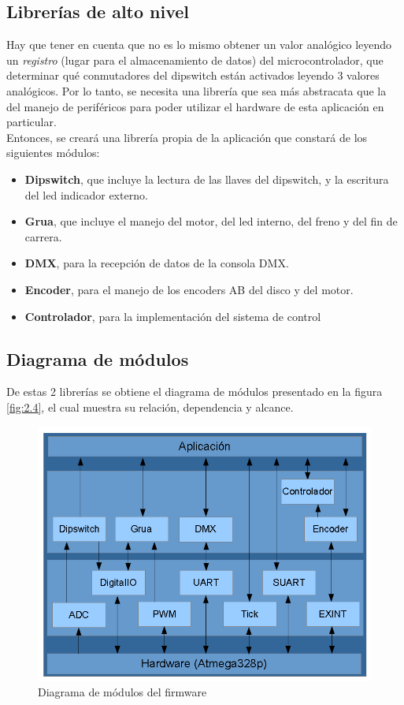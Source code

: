 \subsection{Librerías de alto nivel}
Hay que tener en cuenta que no es lo mismo obtener un valor analógico leyendo un \textit{registro} (lugar para el almacenamiento de datos) del microcontrolador, que determinar qué conmutadores del dipswitch están activados leyendo 3 valores analógicos. Por lo tanto, se necesita una librería que sea más abstracata que la del manejo de periféricos para poder utilizar el hardware de esta aplicación en particular.\\
Entonces, se creará una librería propia de la aplicación que constará de los siguientes módulos:
\begin{itemize}
	\item \textbf{Dipswitch}, que incluye la lectura de las llaves del dipswitch, y la escritura del led indicador externo.
	\item \textbf{Grua}, que incluye el manejo del motor, del led interno, del freno y del fin de carrera.
	\item \textbf{DMX}, para la recepción de datos de la consola DMX.
	\item \textbf{Encoder}, para el manejo de los encoders AB del disco y del motor.
	\item \textbf{Controlador}, para la implementación del sistema de control
\end{itemize}

\subsection{Diagrama de módulos}
De estas 2 librerías se obtiene el diagrama de módulos presentado en la figura \ref{fig:2.4}, el cual muestra su relación, dependencia y alcance. 

\begin{figure}[!ht]
	\centering
	\includegraphics[width=14cm,scale=1]{resources/2_4-diagramaDeModulos.png}
	\caption{Diagrama de módulos del firmware}
	\label{fig:\thefigure}
\end{figure}
